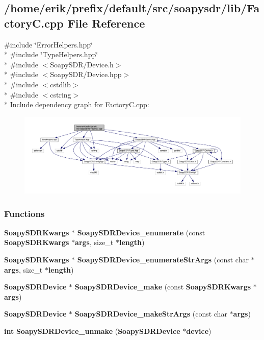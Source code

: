 \subsection{/home/erik/prefix/default/src/soapysdr/lib/\+FactoryC.cpp File Reference}
\label{FactoryC_8cpp}
{\ttfamily \#include \char`\"{}Error\+Helpers.\+hpp\char`\"{}}\\*
{\ttfamily \#include \char`\"{}Type\+Helpers.\+hpp\char`\"{}}\\*
{\ttfamily \#include $<$Soapy\+S\+D\+R/\+Device.\+h$>$}\\*
{\ttfamily \#include $<$Soapy\+S\+D\+R/\+Device.\+hpp$>$}\\*
{\ttfamily \#include $<$cstdlib$>$}\\*
{\ttfamily \#include $<$cstring$>$}\\*
Include dependency graph for Factory\+C.\+cpp\+:
\nopagebreak
\begin{figure}[H]
\begin{center}
\leavevmode
\includegraphics[width=350pt]{d4/da4/FactoryC_8cpp__incl}
\end{center}
\end{figure}
\subsubsection*{Functions}
\begin{DoxyCompactItemize}
\item 
{\bf Soapy\+S\+D\+R\+Kwargs} $\ast$ {\bf Soapy\+S\+D\+R\+Device\+\_\+enumerate} (const {\bf Soapy\+S\+D\+R\+Kwargs} $\ast${\bf args}, size\+\_\+t $\ast${\bf length})
\item 
{\bf Soapy\+S\+D\+R\+Kwargs} $\ast$ {\bf Soapy\+S\+D\+R\+Device\+\_\+enumerate\+Str\+Args} (const char $\ast${\bf args}, size\+\_\+t $\ast${\bf length})
\item 
{\bf Soapy\+S\+D\+R\+Device} $\ast$ {\bf Soapy\+S\+D\+R\+Device\+\_\+make} (const {\bf Soapy\+S\+D\+R\+Kwargs} $\ast${\bf args})
\item 
{\bf Soapy\+S\+D\+R\+Device} $\ast$ {\bf Soapy\+S\+D\+R\+Device\+\_\+make\+Str\+Args} (const char $\ast${\bf args})
\item 
{\bf int} {\bf Soapy\+S\+D\+R\+Device\+\_\+unmake} ({\bf Soapy\+S\+D\+R\+Device} $\ast${\bf device})
\end{DoxyCompactItemize}


